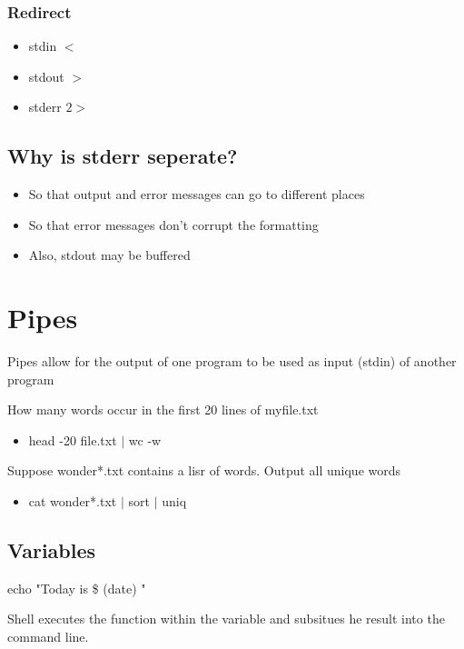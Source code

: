 \documentclass{article}
\newenvironment{cblock}[1]{%
    \tcolorbox[beamer,%
    noparskip,breakable,
    colback=lightblue,colframe=darkblue,%
    colbacklower=darkblue!75!lightblue,%
    title=#1]}%
    {\endtcolorbox}
\begin{document}
\subsubsection{Redirect}
\begin{itemize}
\item stdin \(<\)
\item stdout \(>\)
\item stderr \(2>\)
\end{itemize}

\subsection{Why is stderr seperate?}
\begin{itemize}
\item So that output and error messages can go to different places
\item So that error messages don't corrupt the formatting 
\item Also, stdout may be buffered 
\end{itemize}

\section{Pipes}

Pipes allow for the output of one program to be used as input (stdin) of another program 

\begin{cblock}{Examples}
How many words occur in the first 20 lines of myfile.txt
\begin{itemize}
\item head -20 file.txt \(\mid\) wc -w
\end{itemize}
Suppose wonder*.txt contains a lisr of words. Output all unique words
\begin{itemize}
\item cat wonder*.txt \(\mid\) sort \(\mid\) uniq
\end{itemize}
\end{cblock}

\subsection{Variables}

\begin{cblock}{Example}
echo "Today is \$ (date) "
\end{cblock}

Shell executes the function within the variable and subsitues he result into the command line. 
\end{document}
